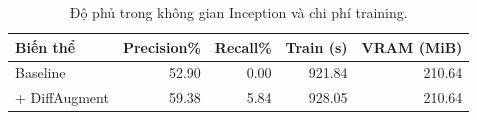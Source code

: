 \begin{table}[htbp]
\centering\small
\caption{Độ phủ trong không gian Inception và chi phí training.}\label{tab:A2cost}
\begin{lrbox}{\reporttable}\begin{tabular}{lrrrr}
\toprule
Biến thể & Precision\% & Recall\% & Train (s) & VRAM (MiB) \\
\midrule
Baseline & 52.90 & 0.00 & 921.84 & 210.64 \\
+ DiffAugment & 59.38 & 5.84 & 928.05 & 210.64 \\
\bottomrule
\end{tabular}\end{lrbox}
\ifdim\wd\reporttable>\linewidth\resizebox{\linewidth}{!}{\usebox{\reporttable}}\else\usebox{\reporttable}\fi
\end{table}
